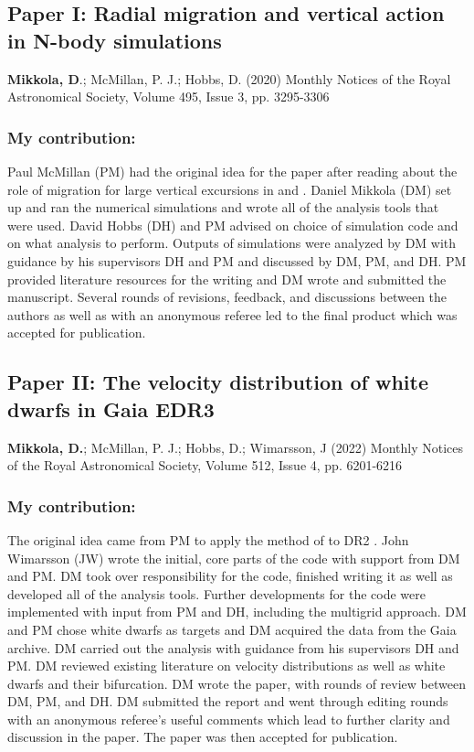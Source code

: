 \newpage
\subsection*{Paper I: Radial migration and vertical action in N-body simulations}
\textbf{Mikkola, D}.; McMillan, P. J.; Hobbs, D. (2020) \newline
Monthly Notices of the Royal Astronomical Society, Volume 495, Issue 3, pp. 3295-3306 \newline

\subsubsection*{My contribution:}
Paul McMillan (PM) had the original idea for the paper after reading about the role of migration for large vertical excursions in \cite{solway:12} and \cite{vera-ciro:14, vera-ciro:16b}. Daniel Mikkola (DM) set up and ran the numerical simulations and wrote all of the analysis tools that were used. David Hobbs (DH) and PM advised on choice of simulation code and on what analysis to perform. Outputs of simulations were analyzed by DM with guidance by his supervisors DH and PM and discussed by DM, PM, and DH. PM provided literature resources for the writing and DM wrote and submitted the manuscript. Several rounds of revisions, feedback, and discussions between the authors as well as with an anonymous referee led to the final product which was accepted for publication.\newpage


\subsection*{Paper II: The velocity distribution of white dwarfs in Gaia EDR3}
\textbf{Mikkola, D.}; McMillan, P. J.; Hobbs, D.; Wimarsson, J (2022) \newline
Monthly Notices of the Royal Astronomical Society, Volume 512, Issue 4, pp. 6201-6216 \newline

\subsubsection*{My contribution:}
The original idea came from PM to apply the method of \cite{dehnen:98a} to DR2 \citep{dr2}. John Wimarsson (JW) wrote the initial, core parts of the code with support from DM and PM. DM took over responsibility for the code, finished writing it as well as developed all of the analysis tools. Further developments for the code were implemented with input from PM and DH, including the multigrid approach. DM and PM chose white dwarfs as targets and DM acquired the data from the Gaia archive. DM carried out the analysis with guidance from his supervisors DH and PM. DM reviewed existing literature on velocity distributions as well as white dwarfs and their bifurcation. DM wrote the paper, with rounds of review between DM, PM, and DH. DM submitted the report and went through editing rounds with an anonymous referee's useful comments which lead to further clarity and discussion in the paper. The paper was then accepted for publication.\newpage


